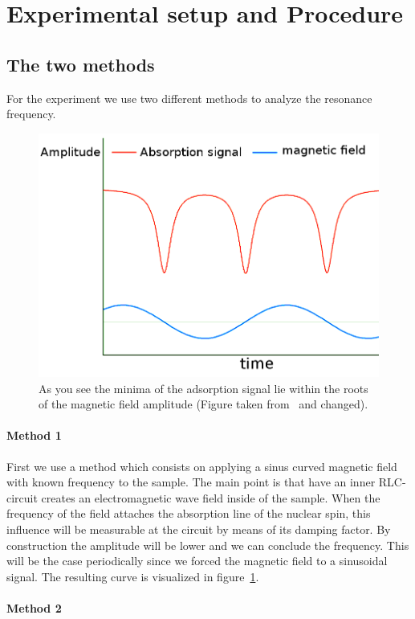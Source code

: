\section{Experimental setup and Procedure}
\subsection{The two methods}
For the experiment we use two different methods to analyze the
resonance frequency.
\begin{figure}[htpb]
    \centering
    \includegraphics[width=0.7\linewidth]{figures/method1}
    \caption{As you see the minima of the adsorption signal lie within
        the roots of the magnetic field amplitude (Figure
            taken from~\cite{versuchsanleitung} and changed).}
    \label{fig:method1}
\end{figure}
\paragraph{Method 1} First we use a method which consists on applying a 
sinus curved magnetic field with known frequency to the sample. 
The main point is that have an inner RLC-circuit creates an electromagnetic
wave field inside of the sample. When the frequency of the field attaches
the absorption line of the nuclear spin, this influence will be measurable
at the circuit by means of its damping factor. By construction the 
amplitude will be lower and we can conclude the frequency. This will
be the case periodically since we forced the magnetic field to a 
sinusoidal signal. The resulting curve is visualized 
in figure~\ref{fig:method1}.
\paragraph{Method 2} 

